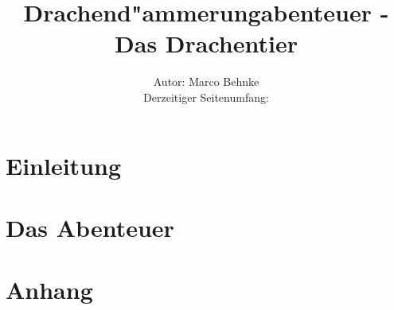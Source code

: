 

\title{Drachend"ammerungabenteuer -\\Das Drachentier}
\author{Autor: Marco Behnke\\
      Derzeitiger Seitenumfang: \pageref{TotalPages}
      }


        \sffamily
        \frontmatter
                \maketitle\newpage
                \tableofcontents
        
        \mainmatter
                \part{Einleitung}
            
                \part{Das Abenteuer}
            
            
            
            
            
            
            
                \part{Anhang}
                        \appendix
            
            
            
            
            

